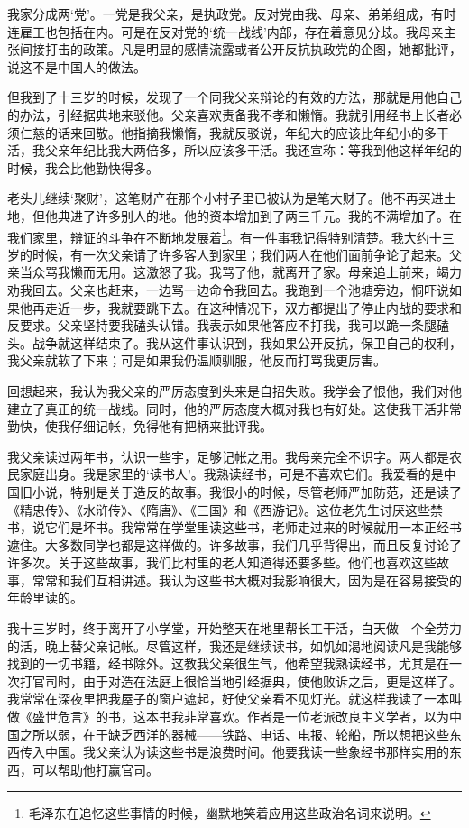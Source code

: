 \documentclass[10pt]{book}
\begin{document}
我家分成两‘党’。一党是我父亲，是执政党。反对党由我、母亲、弟弟组成，有时连雇工也包括在内。可是在反对党的‘统一战线’内部，存在着意见分歧。我母亲主张间接打击的政策。凡是明显的感情流露或者公开反抗执政党的企图，她都批评，说这不是中国人的做法。

但我到了十三岁的时候，发现了一个同我父亲辩论的有效的方法，那就是用他自己的办法，引经据典地来驳他。父亲喜欢责备我不孝和懒惰。我就引用经书上长者必须仁慈的话来回敬。他指摘我懒惰，我就反驳说，年纪大的应该比年纪小的多干活，我父亲年纪比我大两倍多，所以应该多干活。我还宣称：等我到他这样年纪的时候，我会比他勤快得多。

老头儿继续‘聚财’，这笔财产在那个小村子里已被认为是笔大财了。他不再买进土地，但他典进了许多别人的地。他的资本增加到了两三千元。我的不满增加了。在我们家里，辩证的斗争在不断地发展着\footnote{毛泽东在追忆这些事情的时候，幽默地笑着应用这些政治名词来说明。}。有一件事我记得特别清楚。我大约十三岁的时候，有一次父亲请了许多客人到家里；我们两人在他们面前争论了起来。父亲当众骂我懒而无用。这激怒了我。我骂了他，就离开了家。母亲追上前来，竭力劝我回去。父亲也赶来，一边骂一边命令我回去。我跑到一个池塘旁边，恫吓说如果他再走近一步，我就要跳下去。在这种情况下，双方都提出了停止内战的要求和反要求。父亲坚持要我磕头认错。我表示如果他答应不打我，我可以跪一条腿磕头。战争就这样结束了。我从这件事认识到，我如果公开反抗，保卫自己的权利，我父亲就软了下来；可是如果我仍温顺驯服，他反而打骂我更厉害。

回想起来，我认为我父亲的严厉态度到头来是自招失败。我学会了恨他，我们对他建立了真正的统一战线。同时，他的严厉态度大概对我也有好处。这使我干活非常勤快，使我仔细记帐，免得他有把柄来批评我。

我父亲读过两年书，认识一些宇，足够记帐之用。我母亲完全不识字。两人都是农民家庭出身。我是家里的‘读书人’。我熟读经书，可是不喜欢它们。我爱看的是中国旧小说，特别是关于造反的故事。我很小的时候，尽管老师严加防范，还是读了《精忠传》、《水浒传》、《隋唐》、《三国》和《西游记》。这位老先生讨厌这些禁书，说它们是坏书。我常常在学堂里读这些书，老师走过来的时候就用一本正经书遮住。大多数同学也都是这样做的。许多故事，我们几乎背得出，而且反复讨论了许多次。关于这些故事，我们比村里的老人知道得还要多些。他们也喜欢这些故事，常常和我们互相讲述。我认为这些书大概对我影响很大，因为是在容易接受的年龄里读的。

我十三岁时，终于离开了小学堂，开始整天在地里帮长工干活，白天做—个全劳力的活，晚上替父亲记帐。尽管这样，我还是继续读书，如饥如渴地阅读凡是我能够找到的一切书籍，经书除外。这教我父亲很生气，他希望我熟读经书，尤其是在一次打官司时，由于对造在法庭上很恰当地引经据典，使他败诉之后，更是这样了。我常常在深夜里把我屋子的窗户遮起，好使父亲看不见灯光。就这样我读了一本叫做《盛世危言》的书，这本书我非常喜欢。作者是一位老派改良主义学者，以为中国之所以弱，在于缺乏西洋的器械——铁路、电话、电报、轮船，所以想把这些东西传入中国。我父亲认为读这些书是浪费时间。他要我读一些象经书那样实用的东西，可以帮助他打赢官司。
\end{document}
